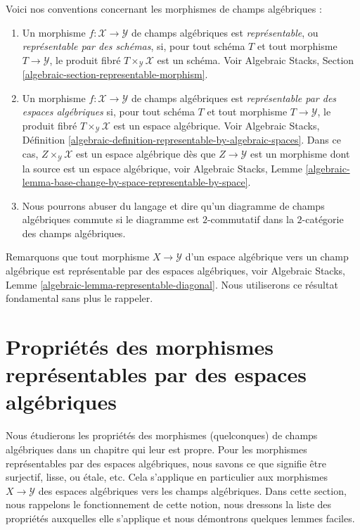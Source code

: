 Voici nos conventions concernant les morphismes de champs algébriques :
\begin{enumerate}
\item Un morphisme $f : \mathcal{X} \to \mathcal{Y}$
de champs algébriques est {\it représentable}, ou
{\it représentable par des schémas}, si, pour tout schéma
$T$ et tout morphisme $T \to \mathcal{Y}$, le produit fibré
$T \times_\mathcal{Y} \mathcal{X}$ est un schéma.
Voir
Algebraic Stacks, Section \ref{algebraic-section-representable-morphism}.
\item Un morphisme $f : \mathcal{X} \to \mathcal{Y}$
de champs algébriques est {\it représentable par des espaces algébriques}
si, pour tout schéma $T$ et tout morphisme $T \to \mathcal{Y}$, le produit fibré
$T \times_\mathcal{Y} \mathcal{X}$ est un espace algébrique.
Voir Algebraic Stacks,
Définition \ref{algebraic-definition-representable-by-algebraic-spaces}.
Dans ce cas, $Z \times_\mathcal{Y} \mathcal{X}$ est un espace
algébrique dès que $Z \to \mathcal{Y}$ est un morphisme dont la source est
un espace algébrique, voir
Algebraic Stacks,
Lemme \ref{algebraic-lemma-base-change-by-space-representable-by-space}.
\item Nous pourrons abuser du langage et dire qu'un diagramme de champs algébriques
commute si le diagramme est $2$-commutatif dans la $2$-catégorie des
champs algébriques.
\end{enumerate}
Remarquons que tout morphisme $X \to \mathcal{Y}$ d'un espace algébrique
vers un champ algébrique est représentable par des espaces algébriques, voir
Algebraic Stacks, Lemme \ref{algebraic-lemma-representable-diagonal}.
Nous utiliserons ce résultat fondamental sans plus le rappeler.




\section{Propriétés des morphismes représentables par des espaces algébriques}
\label{section-properties-morphisms}

\noindent
Nous étudierons les propriétés des morphismes (quelconques) de champs algébriques
dans un chapitre qui leur est propre. Pour les morphismes représentables par des espaces algébriques, nous savons ce que
signifie être surjectif, lisse, ou \'etale, etc. Cela s'applique en particulier
aux morphismes $X \to \mathcal{Y}$ des espaces algébriques vers les champs algébriques.
Dans cette section, nous rappelons le fonctionnement de cette notion, nous dressons la liste des propriétés
auxquelles elle s'applique et nous démontrons quelques lemmes faciles.

